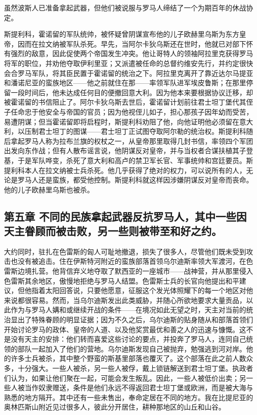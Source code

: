 虽然波斯人已准备拿起武器，但他们被说服与罗马人缔结了一个为期百年的休战协定。\par

斯提利科，霍诺留的军队统帅，被怀疑曾阴谋宣布他的儿子欧赫里乌斯为东方皇帝，因而在拉文纳被军队杀死。早先，当阿尔卡狄乌斯还在世时，他就已对部下怀有强烈的敌意，因此促使两个帝国发生冲突。他让哥特人的领袖阿拉里克获得罗马将军的职位，并劝他夺取伊利里亚；又派遣被任命的总督约维安先行，并约定很快会合罗马军队，将其臣民置于霍诺留的统治之下。阿拉里克离开了靠近达尔马提亚和潘诺尼亚的蛮族地区——他之前就住在那——率领军队进军埃皮鲁斯；在那里停留一段时间后，他未达成任何目的便撤回意大利。因为他本来要根据协议迁移，却被霍诺留的书信阻止了。阿尔卡狄乌斯去世后，霍诺留计划前往君士坦丁堡代其侄子任命忠于他安全与帝国的官员；因为他视侄儿如子，担心那孩子因年幼而受苦，易遭阴谋；但当霍诺留即将启程时，斯提利科劝阻了他，向他证明他必须留在意大利，以压制君士坦丁的图谋——君士坦丁正试图夺取阿尔勒的统治权。斯提利科随后拿起罗马人称为拉布兰旗的权杖之一，从皇帝那里取得几封书信，率领四个军团出发向东作战；但有人散布谣言说，他阴谋反对皇帝，并与当权者合谋扶植其子登基，于是军队哗变，杀死了意大利和高卢的禁卫军长官、军事统帅和宫廷要员。斯提利科本人在拉文纳被士兵杀死。他几乎获得了绝对的权力，可以说所有的人，无论是罗马人还是蛮族，都受他控制。斯提利科就这样因涉嫌阴谋反对皇帝而丧命。他的儿子欧赫里乌斯也被杀。\par


\subsection{第五章 不同的民族拿起武器反抗罗马人，其中一些因天主眷顾而被击败，另一些则被带至和好之约。}

大约同时，驻扎在色雷斯的匈人可耻地撤退，损失了很多人，尽管他们既未受到攻击也没有被追击。住在伊斯特河附近的蛮族部落首领乌尔迪斯率领大军渡河，在色雷斯边境扎营。他背信弃义地夺取了默西亚的一座城市——战神营，并从那里侵入色雷斯其余地区，傲慢地拒绝与罗马人结盟。色雷斯士兵的长官向他提出和平建议，但他指着太阳回答说，只要他愿意，征服这个发光体照耀下的每一个地区对他来说都很容易。然而，当乌尔迪斯发出此类威胁，并随心所欲地要求大量贡品，以此作为与罗马人媾和或继续开战的条件——在境况如此无望之时，天主对当前的统治显出了特殊眷顾的明显证据；因为不久之后，乌尔迪斯的贴身随从和部落首领们开始讨论罗马的政体、皇帝的人道、以及他奖赏最优和善之人的迅速与慷慨。这不是没有天主的安排：他们转而喜爱这些讨论的要点，并投奔了罗马人，连同自己统领的部队一起加入了他们的营地。乌尔迪斯发现自己被抛弃，勉强逃到河对岸。他的许多士兵被杀，其中整个野蛮的斯基里部落也覆灭了。这个部落在此之前人数众多，十分强大。一些人被杀，另一些人被俘，戴上锁链解送到君士坦丁堡。执政者们认为，如果让他们聚在一起，可能会发生叛乱。因此，一些人被低价出卖；另一些人被当作奴隶赠送，条件是他们永远不得返回君士坦丁堡或欧洲，而是被大海与熟悉的地方隔开。其中还有一些未售出，奉命定居在不同的地方。我在比提尼亚的奥林匹斯山附近见过很多人，彼此分开居住，耕种那地区的山丘和山谷。\par

